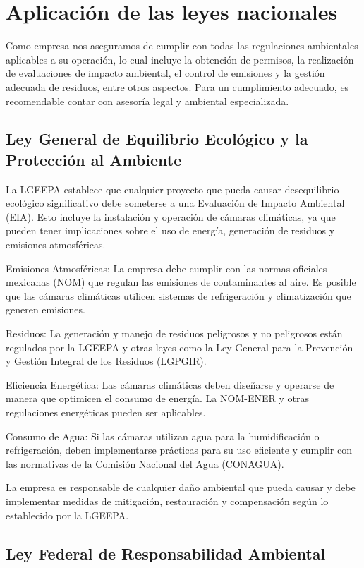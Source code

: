 \section{Aplicación de las leyes nacionales}


Como empresa nos aseguramos de cumplir con todas las regulaciones ambientales aplicables a su operación, lo cual incluye la obtención de permisos, la realización de evaluaciones de impacto ambiental, el control de emisiones y la gestión adecuada de residuos, entre otros aspectos. Para un cumplimiento adecuado, es recomendable contar con asesoría legal y ambiental especializada.

\subsection{Ley General de Equilibrio Ecológico y la Protección al Ambiente}

La LGEEPA establece que cualquier proyecto que pueda causar desequilibrio ecológico significativo debe someterse a una Evaluación de Impacto Ambiental (EIA). Esto incluye la instalación y operación de cámaras climáticas, ya que pueden tener implicaciones sobre el uso de energía, generación de residuos y emisiones atmosféricas.

Emisiones Atmosféricas: La empresa debe cumplir con las normas oficiales mexicanas (NOM) que regulan las emisiones de contaminantes al aire. Es posible que las cámaras climáticas utilicen sistemas de refrigeración y climatización que generen emisiones.

Residuos: La generación y manejo de residuos peligrosos y no peligrosos están regulados por la LGEEPA y otras leyes como la Ley General para la Prevención y Gestión Integral de los Residuos (LGPGIR).

Eficiencia Energética: Las cámaras climáticas deben diseñarse y operarse de manera que optimicen el consumo de energía. La NOM-ENER y otras regulaciones energéticas pueden ser aplicables.

Consumo de Agua: Si las cámaras utilizan agua para la humidificación o refrigeración, deben implementarse prácticas para su uso eficiente y cumplir con las normativas de la Comisión Nacional del Agua (CONAGUA).

La empresa es responsable de cualquier daño ambiental que pueda causar y debe implementar medidas de mitigación, restauración y compensación según lo establecido por la LGEEPA.

\subsection{Ley Federal de Responsabilidad Ambiental}

